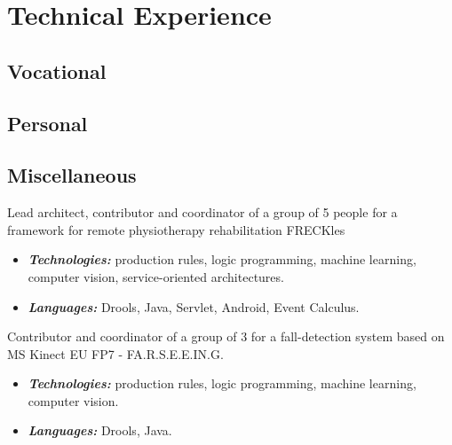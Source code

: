 \section{Technical Experience}
\subsection{Vocational}


\subsection{Personal}


\subsection{Miscellaneous}




\iffalse
{}%
{Lead architect, contributor and coordinator of a group of 5 people for a framework for remote physiotherapy rehabilitation}%
{FRECKles}%
{}%
{}%
{\begin{itemize}
	\item \emph{\textbf{Technologies:}} production rules, logic programming, machine learning, computer vision, service-oriented architectures.
	\item \emph{\textbf{Languages:}} Drools, Java, Servlet, Android, Event Calculus.
\end{itemize}}

%
{Contributor and coordinator of a group of 3 for a fall-detection system based on MS Kinect}%
{EU FP7 - FA.R.S.E.E.IN.G.}%
{}%
{}%
{\begin{itemize}
	\item \emph{\textbf{Technologies:}} production rules, logic programming, machine learning, computer vision.
	\item \emph{\textbf{Languages:}} Drools, Java.
\end{itemize}}








